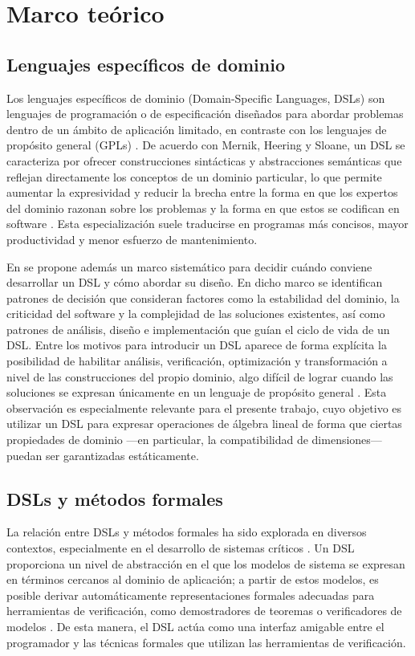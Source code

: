 \documentclass[conference]{IEEEtran}
\begin{document}
\section{Marco teórico}

\subsection{Lenguajes específicos de dominio}

Los lenguajes específicos de dominio (Domain-Specific Languages, DSLs) son lenguajes de programación o de especificación diseñados para abordar problemas dentro de un ámbito de aplicación limitado, en contraste con los lenguajes de propósito general (GPLs) \cite{mernik2005}. De acuerdo con Mernik, Heering y Sloane, un DSL se caracteriza por ofrecer construcciones sintácticas y abstracciones semánticas que reflejan directamente los conceptos de un dominio particular, lo que permite aumentar la expresividad y reducir la brecha entre la forma en que los expertos del dominio razonan sobre los problemas y la forma en que estos se codifican en software \cite{mernik2005}. Esta especialización suele traducirse en programas más concisos, mayor productividad y menor esfuerzo de mantenimiento.

En \cite{mernik2005} se propone además un marco sistemático para decidir cuándo conviene desarrollar un DSL y cómo abordar su diseño. En dicho marco se identifican patrones de decisión que consideran factores como la estabilidad del dominio, la criticidad del software y la complejidad de las soluciones existentes, así como patrones de análisis, diseño e implementación que guían el ciclo de vida de un DSL. Entre los motivos para introducir un DSL aparece de forma explícita la posibilidad de habilitar análisis, verificación, optimización y transformación a nivel de las construcciones del propio dominio, algo difícil de lograr cuando las soluciones se expresan únicamente en un lenguaje de propósito general \cite{mernik2005}. Esta observación es especialmente relevante para el presente trabajo, cuyo objetivo es utilizar un DSL para expresar operaciones de álgebra lineal de forma que ciertas propiedades de dominio —en particular, la compatibilidad de dimensiones— puedan ser garantizadas estáticamente.

\subsection{DSLs y métodos formales}

La relación entre DSLs y métodos formales ha sido explorada en diversos contextos, especialmente en el desarrollo de sistemas críticos \cite{eakman2015}. Un DSL proporciona un nivel de abstracción en el que los modelos de sistema se expresan en términos cercanos al dominio de aplicación; a partir de estos modelos, es posible derivar automáticamente representaciones formales adecuadas para herramientas de verificación, como demostradores de teoremas o verificadores de modelos \cite{eakman2015}. De esta manera, el DSL actúa como una interfaz amigable entre
el programador y las técnicas formales que utilizan
las herramientas de verificación.
\end{document}
